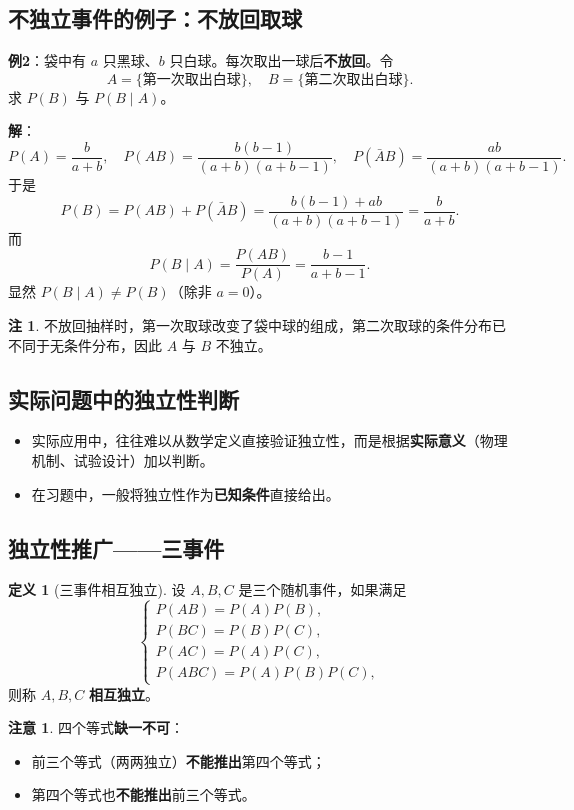 \documentclass[11pt,a4paper]{report}
\theoremstyle{definition}
\newtheorem{definition}{定义}[chapter]
\newtheorem{note}{注}[chapter]
\newtheorem{warning}{注意}[chapter]
\begin{document}
\subsection{不独立事件的例子：不放回取球}

\textbf{例2}：袋中有 $a$ 只黑球、$b$ 只白球。每次取出一球后\textbf{不放回}。令
\[
A = \{\text{第一次取出白球}\}, \quad B = \{\text{第二次取出白球}\}.
\]
求 $P(B)$ 与 $P(B \mid A)$。

\textbf{解}：
\[
P(A) = \frac{b}{a+b}, \quad P(AB) = \frac{b(b-1)}{(a+b)(a+b-1)}, \quad P(\bar{A}B) = \frac{ab}{(a+b)(a+b-1)}.
\]
于是
\[
P(B) = P(AB) + P(\bar{A}B) = \frac{b(b-1)+ab}{(a+b)(a+b-1)} = \frac{b}{a+b}.
\]
而
\[
P(B \mid A) = \frac{P(AB)}{P(A)} = \frac{b-1}{a+b-1}.
\]
显然 $P(B \mid A) \neq P(B)$（除非 $a=0$）。

\begin{note}
不放回抽样时，第一次取球改变了袋中球的组成，第二次取球的条件分布已不同于无条件分布，因此 $A$ 与 $B$ 不独立。
\end{note}

\subsection{实际问题中的独立性判断}

\begin{itemize}[leftmargin=2em]
    \item 实际应用中，往往难以从数学定义直接验证独立性，而是根据\textbf{实际意义}（物理机制、试验设计）加以判断。
    \item 在习题中，一般将独立性作为\textbf{已知条件}直接给出。
\end{itemize}

\subsection{独立性推广——三事件}

\begin{definition}[三事件相互独立]
设 $A, B, C$ 是三个随机事件，如果满足
\[
\begin{cases}
P(AB) = P(A)P(B), \\[0.3em]
P(BC) = P(B)P(C), \\[0.3em]
P(AC) = P(A)P(C), \\[0.3em]
P(ABC) = P(A)P(B)P(C),
\end{cases}
\]
则称 $A, B, C$ \textbf{相互独立}。
\end{definition}

\begin{warning}
四个等式\textbf{缺一不可}：
\begin{itemize}[leftmargin=2em]
    \item 前三个等式（两两独立）\textbf{不能推出}第四个等式；
    \item 第四个等式也\textbf{不能推出}前三个等式。
\end{itemize}
\end{warning}
\end{document}
